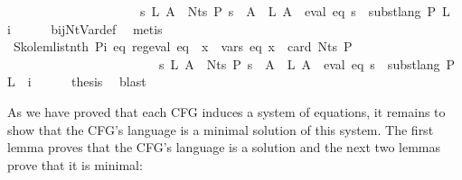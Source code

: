 \begin{isabellebody}
\ \ \ \ \ \ \ \ \ \ \ \ \ \ \ \ \ \ \ \ {\isasymand}\ {\isacharparenleft}{\kern0pt}{\isasymforall}s\ L{\isachardot}{\kern0pt}\ {\isacharparenleft}{\kern0pt}{\isasymforall}A\ {\isasymin}\ Nts\ P{\isachardot}{\kern0pt}\ s\ {\isacharparenleft}{\kern0pt}{\isasymgamma}{\isacharprime}{\kern0pt}\ A{\isacharparenright}{\kern0pt}\ {\isacharequal}{\kern0pt}\ L\ A{\isacharparenright}{\kern0pt}\ {\isasymlongrightarrow}\ eval\ eq\ s\ {\isacharequal}{\kern0pt}\ subst{\isacharunderscore}{\kern0pt}lang\ P\ L\ {\isacharparenleft}{\kern0pt}{\isasymgamma}\ i{\isacharparenright}{\kern0pt}{\isacharparenright}{\kern0pt}{\isachardoublequoteclose}\isanewline
\ \ \ \ \isamarkupfalse%
\ bij{\isacharunderscore}{\kern0pt}Nt{\isacharunderscore}{\kern0pt}Var{\isacharunderscore}{\kern0pt}def\ \isamarkupfalse%
\ metis\isanewline
\ \ \isamarkupfalse%
\ Skolem{\isacharunderscore}{\kern0pt}list{\isacharunderscore}{\kern0pt}nth{\isacharbrackleft}{\kern0pt}\ P{\isacharequal}{\kern0pt}{\isachardoublequoteopen}{\isasymlambda}i\ eq{\isachardot}{\kern0pt}\ reg{\isacharunderscore}{\kern0pt}eval\ eq\ {\isasymand}\ {\isacharparenleft}{\kern0pt}{\isasymforall}x\ {\isasymin}\ vars\ eq{\isachardot}{\kern0pt}\ x\ {\isacharless}{\kern0pt}\ card\ {\isacharparenleft}{\kern0pt}Nts\ P{\isacharparenright}{\kern0pt}{\isacharparenright}{\kern0pt}\isanewline
\ \ \ \ \ \ \ \ \ \ \ \ \ \ \ \ \ \ \ \ \ \ \ {\isasymand}\ {\isacharparenleft}{\kern0pt}{\isasymforall}s\ L{\isachardot}{\kern0pt}\ {\isacharparenleft}{\kern0pt}{\isasymforall}A\ {\isasymin}\ Nts\ P{\isachardot}{\kern0pt}\ s\ {\isacharparenleft}{\kern0pt}{\isasymgamma}{\isacharprime}{\kern0pt}\ A{\isacharparenright}{\kern0pt}\ {\isacharequal}{\kern0pt}\ L\ A{\isacharparenright}{\kern0pt}\ {\isasymlongrightarrow}\ eval\ eq\ s\ {\isacharequal}{\kern0pt}\ subst{\isacharunderscore}{\kern0pt}lang\ P\ L\ {\isacharparenleft}{\kern0pt}{\isasymgamma}\ i{\isacharparenright}{\kern0pt}{\isacharparenright}{\kern0pt}{\isachardoublequoteclose}{\isacharbrackright}{\kern0pt}\isanewline
\ \ \ \ \isamarkupfalse%
\ {\isacharquery}{\kern0pt}thesis\ \isamarkupfalse%
\ blast\isanewline
{}\isamarkupfalse%
%
\endisatagproof
{\isafoldproof}%
%
\isadelimproof
%
\endisadelimproof
%
\begin{isamarkuptext}%
As we have proved that each CFG induces a system of equations, it remains to show that the
 CFG's language is a minimal solution of this system. The first lemma proves that the CFG's language
is a solution and the next two lemmas prove that it is minimal:%

\end{isamarkuptext}
\end{isabellebody}

